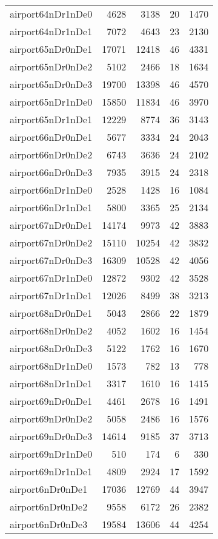\begin{tabular}{lrrrr}
airport64nDr1nDe0 & 4628 & 3138 & 20 & 1470 \\
airport64nDr1nDe1 & 7072 & 4643 & 23 & 2130 \\
airport65nDr0nDe1 & 17071 & 12418 & 46 & 4331 \\
airport65nDr0nDe2 & 5102 & 2466 & 18 & 1634 \\
airport65nDr0nDe3 & 19700 & 13398 & 46 & 4570 \\
airport65nDr1nDe0 & 15850 & 11834 & 46 & 3970 \\
airport65nDr1nDe1 & 12229 & 8774 & 36 & 3143 \\
airport66nDr0nDe1 & 5677 & 3334 & 24 & 2043 \\
airport66nDr0nDe2 & 6743 & 3636 & 24 & 2102 \\
airport66nDr0nDe3 & 7935 & 3915 & 24 & 2318 \\
airport66nDr1nDe0 & 2528 & 1428 & 16 & 1084 \\
airport66nDr1nDe1 & 5800 & 3365 & 25 & 2134 \\
airport67nDr0nDe1 & 14174 & 9973 & 42 & 3883 \\
airport67nDr0nDe2 & 15110 & 10254 & 42 & 3832 \\
airport67nDr0nDe3 & 16309 & 10528 & 42 & 4056 \\
airport67nDr1nDe0 & 12872 & 9302 & 42 & 3528 \\
airport67nDr1nDe1 & 12026 & 8499 & 38 & 3213 \\
airport68nDr0nDe1 & 5043 & 2866 & 22 & 1879 \\
airport68nDr0nDe2 & 4052 & 1602 & 16 & 1454 \\
airport68nDr0nDe3 & 5122 & 1762 & 16 & 1670 \\
airport68nDr1nDe0 & 1573 & 782 & 13 & 778 \\
airport68nDr1nDe1 & 3317 & 1610 & 16 & 1415 \\
airport69nDr0nDe1 & 4461 & 2678 & 16 & 1491 \\
airport69nDr0nDe2 & 5058 & 2486 & 16 & 1576 \\
airport69nDr0nDe3 & 14614 & 9185 & 37 & 3713 \\
airport69nDr1nDe0 & 510 & 174 & 6 & 330 \\
airport69nDr1nDe1 & 4809 & 2924 & 17 & 1592 \\
airport6nDr0nDe1 & 17036 & 12769 & 44 & 3947 \\
airport6nDr0nDe2 & 9558 & 6172 & 26 & 2382 \\
airport6nDr0nDe3 & 19584 & 13606 & 44 & 4254 \\

\end{tabular}
